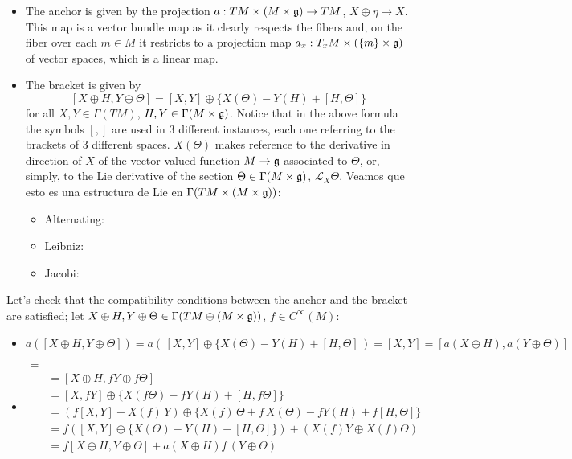     \begin{itemize}
    \item The anchor is given by the projection $a: TM \times (M \times \mathfrak{g}) \to TM$, $X \oplus \eta \mapsto X$. This map is a vector bundle map as it clearly respects the fibers and, on the fiber over each $m\in M$ it restricts to  a projection map $a_x:T_x M \times (\{m\}\times \mathfrak{g})$ of vector spaces, which is a linear map.
    
    \item The bracket is given by 
    \[
        [X \oplus H, Y \oplus \Theta] = [X, Y] \oplus \{X(\Theta) - Y(H) + [H, \Theta]\}
    \]
    for all $X, Y \in \Gamma(TM)$, $H, Y \in \Gamma(M \times \mathfrak{g})$. Notice that in the above formula the symbols $[,]$ are used in $3$ different instances, each one referring to the brackets of $3$ different spaces. $X(\Theta)$ makes reference to the derivative in direction of $X$ of the vector valued function $M \to \mathfrak{g}$ associated to $\Theta$, or, simply, to the Lie derivative of the section $\Theta \in \Gamma(M \times \mathfrak{g})$, $\mathcal L_X \Theta$. Veamos que esto es una estructura de Lie en $\Gamma(TM \times (M \times \mathfrak{g}))$:
        \begin{itemize}
        \item Alternating:
        \item Leibniz:
        \item Jacobi:
        \end{itemize}
    \end{itemize}

Let's check that the compatibility conditions between the anchor and the bracket are satisfied; let $X \oplus H, Y \oplus \Theta \in \Gamma(TM \oplus (M \times \mathfrak{g}))$, $f \in C^\infty(M)$:

    \begin{itemize}
    \item $a([X \oplus H, Y \oplus \Theta]) = a(\, [X, Y] \oplus \{X(\Theta) - Y(H) + [H, \Theta] \,) = [X, Y] = [a(X \oplus H), a(Y \oplus \Theta)]$
    
    \item 
    \begin{align*}
        [X \oplus H, &f\cdot (Y \oplus \Theta)] =\\
        &= [X \oplus H, fY \oplus f\Theta] \\
        &=  [X, fY] \oplus \{X(f\Theta) - fY(H) + [H, f\Theta]\} \\
        &= (f[X, Y] + X(f)\,Y) \oplus \{X(f)\,\Theta + f\,X(\Theta) - fY(H) + f[H, \Theta]\} \\
        &=f([X, Y] \oplus \{ X(\Theta) -Y(H) + [H, \Theta]\} ) + (X(f) Y \oplus X(f)\Theta) \\
        &= f[X \oplus H, Y \oplus \Theta] + a(X \oplus H)f \, (Y \oplus \Theta)
    \end{align*}
    \end{itemize}

